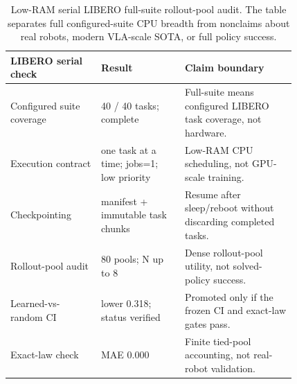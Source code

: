 \begin{table}[t]
\centering
\scriptsize
\setlength{\tabcolsep}{3pt}
\begin{tabular}{p{0.26\linewidth}p{0.24\linewidth}p{0.32\linewidth}}
\toprule
LIBERO serial check & Result & Claim boundary \\
\midrule
Configured suite coverage & 40 / 40 tasks; complete & Full-suite means configured LIBERO task coverage, not hardware. \\
Execution contract & one task at a time; jobs=1; low priority & Low-RAM CPU scheduling, not GPU-scale training. \\
Checkpointing & manifest + immutable task chunks & Resume after sleep/reboot without discarding completed tasks. \\
Rollout-pool audit & 80 pools; N up to 8 & Dense rollout-pool utility, not solved-policy success. \\
Learned-vs-random CI & lower 0.318; status verified & Promoted only if the frozen CI and exact-law gates pass. \\
Exact-law check & MAE 0.000 & Finite tied-pool accounting, not real-robot validation. \\
\bottomrule
\end{tabular}
\caption{Low-RAM serial LIBERO full-suite rollout-pool audit. The table separates full configured-suite CPU breadth from nonclaims about real robots, modern VLA-scale SOTA, or full policy success.}
\label{tab:libero-full-suite-serial}
\end{table}
